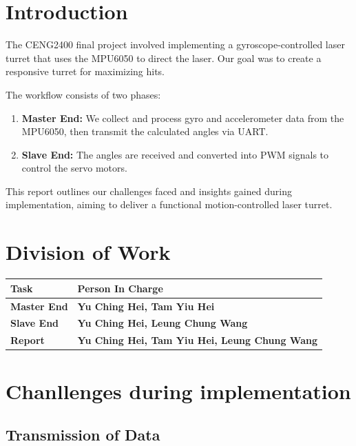 \documentclass[12pt, a4paper]{article}
\begin{document}
\section{Introduction}
The CENG2400 final project involved implementing a gyroscope-controlled laser turret 
that uses the MPU6050 to direct the laser. Our goal was to create a responsive turret for maximizing hits.

\noindent The workflow consists of two phases:
\begin{enumerate}
    \item \textbf{Master End:} We collect and process gyro and accelerometer 
          data from the \\MPU6050, then transmit the calculated angles via UART.
    \item \textbf{Slave End:} The angles are received and converted into PWM 
          signals to control the servo motors.
\end{enumerate}
This report outlines our challenges faced and insights gained during implementation, aiming to deliver a functional motion-controlled laser turret.

\section{Division of Work}
\begin{tabularx}{\textwidth}{|l||X|}
    \hline
    \textbf{Task} & \textbf{Person In Charge} \\
    \hline\hline
    \textbf{Master End} & \textbf{Yu Ching Hei, Tam Yiu Hei} \\
    \hline
    \textbf{Slave End} & \textbf{Yu Ching Hei, Leung Chung Wang} \\
    \hline
    \textbf{Report} & \textbf{Yu Ching Hei, Tam Yiu Hei, Leung Chung Wang} \\
    \hline
\end{tabularx}

\section{Chanllenges during implementation}
\subsection{Transmission of Data}
\end{document}
